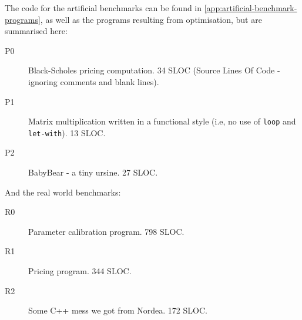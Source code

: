 The code for the artificial benchmarks can be found in
\cref{app:artificial-benchmark-programs}, as well as the programs
resulting from optimisation, but are summarised here:

\begin{description}
\item[P0] Black-Scholes\cite{black1973pricing} pricing computation.
  34 SLOC (Source Lines Of Code - ignoring comments and blank lines).

\item[P1] Matrix multiplication written in a functional style (i.e, no
  use of \texttt{loop} and \texttt{let-with}).  13 SLOC.

\item[P2] BabyBear - a tiny ursine.  27 SLOC.
\end{description}

And the real world benchmarks:

\begin{description}
\item[R0] Parameter calibration program.  798 SLOC.

\item[R1] Pricing program.  344 SLOC.

\item[R2] Some C++ mess we got from Nordea.  172 SLOC.
\end{description}

